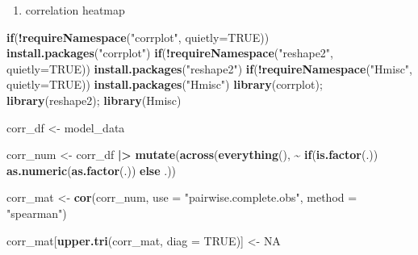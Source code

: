 \documentclass[
]{article}
\newenvironment{Shaded}{\begin{snugshade}}{\end{snugshade}}
\newcommand{\AttributeTok}[1]{\textcolor[rgb]{0.13,0.29,0.53}{#1}}
\newcommand{\ConstantTok}[1]{\textcolor[rgb]{0.56,0.35,0.01}{#1}}
\newcommand{\ControlFlowTok}[1]{\textcolor[rgb]{0.13,0.29,0.53}{\textbf{#1}}}
\newcommand{\FunctionTok}[1]{\textcolor[rgb]{0.13,0.29,0.53}{\textbf{#1}}}
\newcommand{\NormalTok}[1]{#1}
\newcommand{\OtherTok}[1]{\textcolor[rgb]{0.56,0.35,0.01}{#1}}
\newcommand{\SpecialCharTok}[1]{\textcolor[rgb]{0.81,0.36,0.00}{\textbf{#1}}}
\newcommand{\StringTok}[1]{\textcolor[rgb]{0.31,0.60,0.02}{#1}}
\providecommand{\tightlist}{%
  \setlength{\itemsep}{0pt}\setlength{\parskip}{0pt}}
\begin{document}
\begin{enumerate}
\def\labelenumi{\arabic{enumi}.}
\setcounter{enumi}{1}
\tightlist
\item
  correlation heatmap
\end{enumerate}

\begin{Shaded}
\begin{Highlighting}[]
\ControlFlowTok{if}\NormalTok{(}\SpecialCharTok{!}\FunctionTok{requireNamespace}\NormalTok{(}\StringTok{"corrplot"}\NormalTok{, }\AttributeTok{quietly=}\ConstantTok{TRUE}\NormalTok{)) }\FunctionTok{install.packages}\NormalTok{(}\StringTok{"corrplot"}\NormalTok{)}
\ControlFlowTok{if}\NormalTok{(}\SpecialCharTok{!}\FunctionTok{requireNamespace}\NormalTok{(}\StringTok{"reshape2"}\NormalTok{, }\AttributeTok{quietly=}\ConstantTok{TRUE}\NormalTok{)) }\FunctionTok{install.packages}\NormalTok{(}\StringTok{"reshape2"}\NormalTok{)}
\ControlFlowTok{if}\NormalTok{(}\SpecialCharTok{!}\FunctionTok{requireNamespace}\NormalTok{(}\StringTok{"Hmisc"}\NormalTok{, }\AttributeTok{quietly=}\ConstantTok{TRUE}\NormalTok{)) }\FunctionTok{install.packages}\NormalTok{(}\StringTok{"Hmisc"}\NormalTok{)}
\FunctionTok{library}\NormalTok{(corrplot); }\FunctionTok{library}\NormalTok{(reshape2); }\FunctionTok{library}\NormalTok{(Hmisc)}

\NormalTok{corr\_df }\OtherTok{\textless{}{-}}\NormalTok{ model\_data }

\NormalTok{corr\_num }\OtherTok{\textless{}{-}}\NormalTok{ corr\_df }\SpecialCharTok{|\textgreater{}}
  \FunctionTok{mutate}\NormalTok{(}\FunctionTok{across}\NormalTok{(}\FunctionTok{everything}\NormalTok{(), }\SpecialCharTok{\textasciitilde{}} \ControlFlowTok{if}\NormalTok{(}\FunctionTok{is.factor}\NormalTok{(.)) }\FunctionTok{as.numeric}\NormalTok{(}\FunctionTok{as.factor}\NormalTok{(.)) }\ControlFlowTok{else}\NormalTok{ .))}

\NormalTok{corr\_mat }\OtherTok{\textless{}{-}} \FunctionTok{cor}\NormalTok{(corr\_num, }\AttributeTok{use =} \StringTok{"pairwise.complete.obs"}\NormalTok{, }\AttributeTok{method =} \StringTok{"spearman"}\NormalTok{)}

\NormalTok{corr\_mat[}\FunctionTok{upper.tri}\NormalTok{(corr\_mat, }\AttributeTok{diag =} \ConstantTok{TRUE}\NormalTok{)] }\OtherTok{\textless{}{-}} \ConstantTok{NA}


\end{Highlighting}
\end{Shaded}
\end{document}
